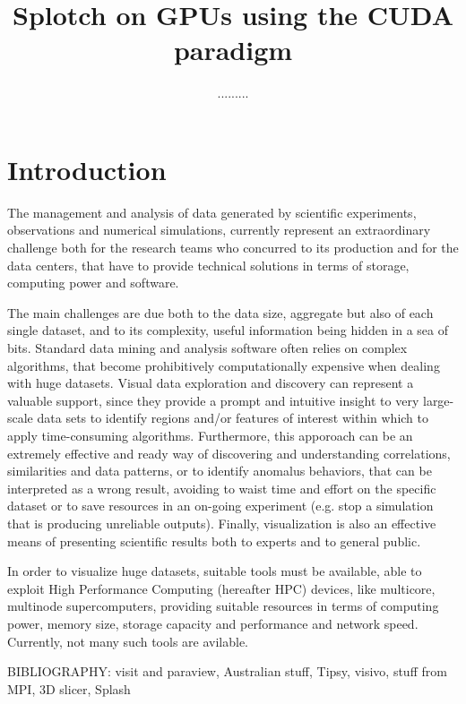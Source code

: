 \documentclass[11pt]{article}
\title{Splotch on GPUs using the CUDA paradigm}
\author{.........}
\begin{document}
\maketitle

\section{Introduction}
\label{sec:intro}

The management and analysis of data generated by scientific experiments, 
observations and numerical simulations, currently represent an extraordinary challenge  
both for the research teams who concurred to its production and for 
the data centers, that have to provide technical solutions in terms of 
storage, computing power and software.

The main challenges are due both to the data size, aggregate but also of each 
single dataset, and to its complexity, useful information being hidden in a sea 
of bits. Standard data mining and analysis software often relies on complex
algorithms, that become prohibitively computationally expensive when dealing with 
huge datasets. Visual data exploration and discovery can represent a valuable
support, since they provide a prompt and intuitive insight to
very large-scale data sets to identify regions and/or features of interest within which
to apply time-consuming algorithms. 
Furthermore, this apporoach can be an extremely effective and ready way of discovering 
and understanding correlations,
similarities and data patterns, or to identify anomalus behaviors, that can be
interpreted as a wrong result, avoiding to waist time and effort on the specific dataset or
to save resources in an on-going experiment (e.g. stop a simulation that is producing 
unreliable outputs). Finally, visualization is also an effective means of presenting
scientific results both to experts and to general public.

In order to visualize huge datasets, suitable tools must be available, able to 
exploit High Performance Computing (hereafter HPC) devices, like multicore, multinode
supercomputers, providing suitable resources in terms of computing power, memory size, 
storage capacity and performance and network speed. Currently, not many such tools are avilable.

BIBLIOGRAPHY: visit and paraview, Australian stuff, Tipsy, visivo, stuff from MPI, 3D slicer, Splash
\end{document}
